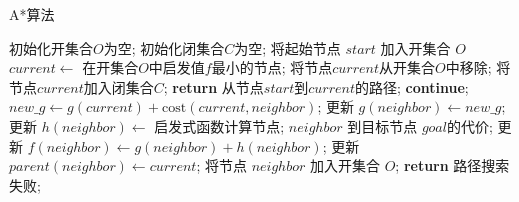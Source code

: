 \begin{algorithm}[!tbh]
\caption{A*算法}
\label{alg:intro_Astar}
\begin{algorithmic}[1]
    \STATE 初始化开集合$O$为空;  %
    \STATE 初始化闭集合$C$为空;  %
    \STATE 将起始节点 $start$ 加入开集合 $O$
        \STATE $current \gets$ 在开集合$O$中启发值$f$最小的节点;  %
        \STATE 将节点$current$从开集合$O$中移除;
        \STATE 将节点$current$加入闭集合$C$;
            \STATE \textbf{return} 从节点$start$到$current$的路径;
        \ENDIF
                \STATE \textbf{continue};
            \ENDIF
            \STATE $new\_g \gets g(current) + \text{cost}(current, neighbor)$;  %
                \STATE 更新 $g(neighbor) \gets new\_g$;
                \STATE 更新 $h(neighbor) \gets$ 启发式函数计算节点; $neighbor$ 到目标节点 $goal$的代价;
                \STATE 更新 $f(neighbor) \gets g(neighbor) + h(neighbor)$;
                \STATE 更新 $parent(neighbor) \gets current$;
                    \STATE 将节点 $neighbor$ 加入开集合 $O$;
                \ENDIF
            \ENDIF
        \ENDFOR
    \ENDWHILE
    \STATE \textbf{return} 路径搜索失败;  %
\end{algorithmic}
\end{algorithm}


